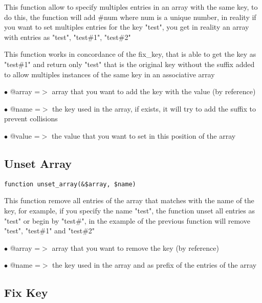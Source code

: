 \documentclass[a4paper]{book}
\begin{document}
This function allow to specify multiples entries in an array with the same key,
to do this, the function will add \#num where num is a unique number, in reality
if you want to set multiples entries for the key "test", you get in reality an
array with entries as "test", "test\#1", "test\#2"

This function works in concordance of the fix\_key, that is able to get the key
as "test\#1" and return only "test" that is the original key without the suffix
added to allow multiples instances of the same key in an associative array

\begin{compactitem}
\item[\color{myblue}$\bullet$] @array =$>$ array that you want to add the key with the value (by reference)
\item[\color{myblue}$\bullet$] @name  =$>$ the key used in the array, if exists, it will try to add the suffix to
          prevent collisions
\item[\color{myblue}$\bullet$] @value =$>$ the value that you want to set in this position of the array
\end{compactitem}

\hypertarget{toc319}{}
\subsection{Unset Array}

\begin{lstlisting}
function unset_array(&$array, $name)
\end{lstlisting}

This function remove all entries of the array that matches with the name of
the key, for example, if you specify the name "test", the function unset all
entries as "test" or begin by "test\#", in the example of the previous function
will remove "test", "test\#1" and "test\#2"

\begin{compactitem}
\item[\color{myblue}$\bullet$] @array =$>$ array that you want to remove the key (by reference)
\item[\color{myblue}$\bullet$] @name  =$>$ the key used in the array and as prefix of the entries of the array
\end{compactitem}

\hypertarget{toc320}{}
\subsection{Fix Key}
\end{document}
